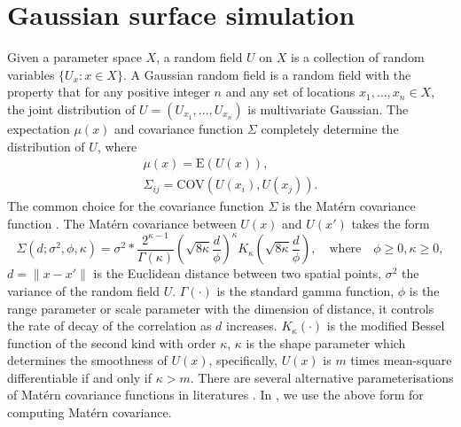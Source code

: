 \documentclass[article,nojss]{jss}\usepackage[]{graphicx}\usepackage[]{color}
\def\cov{{\text{COV}}}
\def\E{{\text{E}}}
\begin{document}
\section{Gaussian surface simulation} 
Given a parameter space $X$, a random field $U$ on $X$ is a collection of random variables $\{U_x :x\in X\}$. A Gaussian random field is a random field with the property that for any positive integer $n$ and any set of locations $x_1,\dots,x_n \in X$, the joint distribution of $U=(U_{x_1},\dots,U_{x_n})$ is multivariate Gaussian. The expectation $\mu(x)$ and covariance function $\Sigma$ completely determine the distribution of $U$, where 
\begin{gather*} 
\mu(x) = \E (U(x)),\\
\Sigma_{ij} = \cov (U(x_i),U(x_j)).
\end{gather*}
The common choice for the covariance function $\Sigma$ is the Mat\'ern covariance function \citep{matern1960spatial}. The Mat\'ern covariance between $U(x)$ and $U(x')$ takes the form 
\begin{equation*}
\Sigma(d;\sigma^2,\phi,\kappa)=\sigma^2*\frac{2^{\kappa-1}}{\Gamma(\kappa)} (\sqrt{8\kappa} \frac{d}{\phi})^\kappa  K_\kappa(\sqrt{8\kappa}  \frac{d}{\phi}),  \quad \text{where} \quad \phi 	\geq 0,  \kappa 	\geq 0,
\end{equation*} 
$d =\|x-x'\|$ is the Euclidean distance between two spatial points, 
$\sigma^2$ the variance of the random field $U$.
$\Gamma(\cdot)$ is the standard gamma function,  $\phi$ is the range parameter or scale parameter with the dimension of distance, it controls the rate of decay of the correlation as $d$ increases. $K_\kappa(\cdot)$ is the modified Bessel function of the second kind with order $\kappa$, $\kappa$ is the shape parameter which determines the smoothness of $U(x)$, specifically, $U(x)$ is $m$ times mean-square differentiable if and only if $\kappa > m$. %
There are several alternative parameterisations of Mat\'ern covariance functions in literatures  \citep[see][]{haskard2007anisotropic}. In , we use the above form for computing Mat\'ern covariance.
\end{document}
